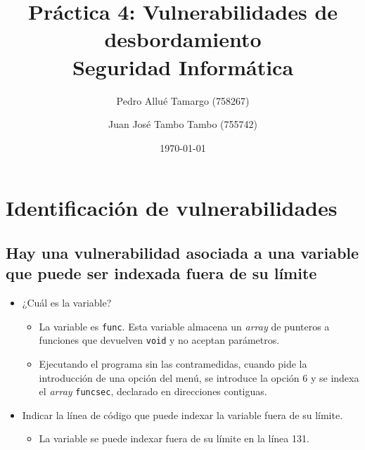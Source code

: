 \documentclass[10pt,a4paper]{article}
\begin{document}
\begin{titlepage}
\title{\textbf{
	{\Huge Práctica 4: Vulnerabilidades de desbordamiento}\\
	{\Large Seguridad Informática}
}}
\author{
	Pedro Allué Tamargo (758267)
	\and
	Juan José Tambo Tambo (755742)
}
\date{\today}
\clearpage\maketitle
\thispagestyle{empty}
\tableofcontents
\end{titlepage}

\section{Identificación de vulnerabilidades}

\subsection{Hay una vulnerabilidad asociada a una variable que puede ser indexada fuera de su límite}
\begin{itemize}
\item ¿Cuál es la variable?
	\begin{itemize}
	\item La variable es \texttt{func}. Esta variable almacena un \emph{array} de punteros a funciones que devuelven \texttt{void} y no aceptan parámetros.
	\item Ejecutando el programa sin las contramedidas, cuando pide la introducción de una opción del menú, se introduce la opción 6 y se indexa el \emph{array} \texttt{funcsec}, declarado en direcciones contiguas.
	\end{itemize}
\item Indicar la línea de código que puede indexar la variable fuera de su límite.
	\begin{itemize}
	\item La variable se puede indexar fuera de su límite en la línea 131.
	\end{itemize}
\end{itemize}
\end{document}
